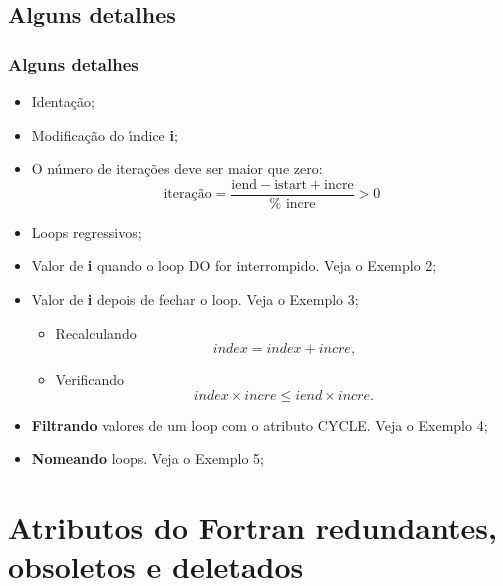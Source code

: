 \documentclass[xcolor=table]{beamer}
\newenvironment{stepitemize}{\begin{itemize}[<+->]}{\end{itemize} }
\begin{document}
\subsection{Alguns detalhes}

\begin{frame}%

\frametitle{Alguns detalhes}

\begin{stepitemize}
\item Identa\c{c}\~{a}o;

\item Modifica\c{c}\~{a}o do \'{\i}ndice \textbf{i};

\item O n\'{u}mero de itera\c{c}\~{o}es deve ser maior que zero:%
\[
\text{itera\c{c}\~{a}o}=\frac{\text{iend}-\text{istart}+\text{incre}}{\text{%
incre}}>0 
\]

\item Loops regressivos;

\item Valor de \textbf{i} quando o loop DO for interrompido. Veja o Exemplo
2;

\item Valor de \textbf{i} depois de fechar o loop. Veja o Exemplo 3;

\begin{itemize}
\item Recalculando 
\[
index=index+incre\text{,} 
\]

\item Verificando%
\[
index\times incre\leqslant iend\times incre\text{.} 
\]
\end{itemize}

\item \textbf{Filtrando} valores de um loop com o atributo CYCLE. Veja o
Exemplo 4;

\item \textbf{Nomeando} loops. Veja o Exemplo 5;
\end{stepitemize}

\transboxout%
\end{frame}%

\section{Atributos do Fortran redundantes, obsoletos e deletados}
\end{document}
